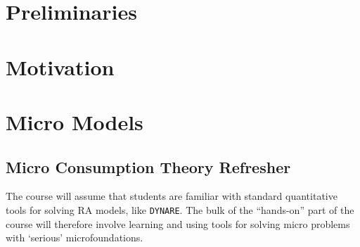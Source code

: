\documentclass{\econtex}\newcommand{\texname}{Syllabus} \usepackage{\econtexSetup}\usepackage{\econtexShortcuts} \reversemarginpar
\begin{document}


\ifdvi
{}
\fi





  \thispagestyle{empty}

  \pagestyle{plain}
  \thispagestyle{empty}

  \begin{center}

    
    

  \end{center}

  \normalsize


\pagebreak
\section{Preliminaries}


\providecommand{\sectype}{\section}%

\section{Motivation}

\section{Micro Models}
\subsection{Micro Consumption Theory Refresher}

The course will assume that students are familiar with standard quantitative tools for solving RA models, like \texttt{DYNARE}.
The bulk of the ``hands-on'' part of the course will therefore involve learning and using tools for solving micro problems with `serious' microfoundations.
\end{document}
